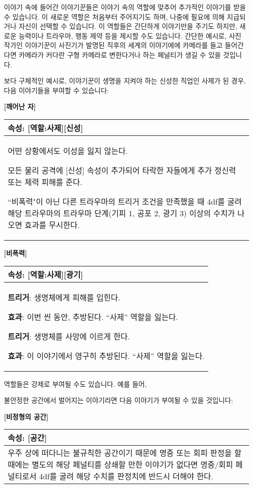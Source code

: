 \documentclass[12pt]{report}
\newenvironment{story}[2]
{\begin{center}
		{\large \textbf{[#1]}}\\[1ex]
		\begin{tabular}{|p{\textwidth}|}
			\hline
			\textbf{속성}: #2
			\\
			\hline
		}
		{ 
			\\\hline
		\end{tabular}
	\end{center}
}
\begin{document}
	이야기 속에 들어간 이야기꾼들은 이야기 속의 역할에 맞추어 추가적인 이야기를 받을 수 있습니다. 이 새로운 역할은 처음부터 주어지기도 하며, 나중에 필요에 의해 지급되거나 자신이 선택할 수 있습니다. 이 역할들은 간단하게 이야기만을 주기도 하지만, 새로운 능력이나 트라우마, 행동 제약 등을 제시할 수도 있습니다. 간단한 예시로, 사진 작가인 이야기꾼이 사진기가 발명된 직후의 세계의 이야기에에 카메라를 들고 들어간다면 카메라가 커다란 구형 카메라로 변한다거나 하는 페널티가 생길 수 있을 것입니다.

	\bigskip

	보다 구체적인 예시로, 이야기꾼이 생명을 지켜야 하는 신성한 직업인 사제가 된 경우, 다음 이야기들을 부여할 수 있습니다:
	
	\begin{story}{깨어난 자}{[역할:사제][신성]}
		어떤 상황에서도 이성을 잃지 않는다.
		
		모든 물리 공격에 [신성] 속성이 추가되어 타락한 자들에게 추가 정신력 또는 체력 피해를 준다.
		
		“비폭력"이 아닌 다른 트라우마의 트리거 조건을 만족했을 때 4df를 굴려 해당 트라우마의 트라우마 단계(기피 1, 공포 2, 광기 3) 이상의 수치가 나오면 효과를 무시한다.
	\end{story}
	
	\begin{story}{비폭력}{[역할:사제][광기]}
		\textbf{트리거}: 생명체에게 피해를 입힌다.
		
		\textbf{효과}: 이번 씬 동안, 추방된다. “사제” 역할을 잃는다.
		
		\textbf{트리거}: 생명체를 사망에 이르게 한다.
		
		\textbf{효과}: 이 이야기에서 영구히 추방된다. “사제” 역할을 잃는다.
	\end{story}
	
	역할들은 강제로 부여될 수도 있습니다. 예를 들어,
\iffalse
	러브크래프트 세계관에 들어간 이야기꾼들은 다음과 같은 역할이 부여될 수 있습니다:
	\begin{story}{점점 미쳐가는 이야기}{[세계][설화][광기]}
		이성치 100을 얻는다. 일반적으로 이해할 수 없는 일(살인, 시체, 고대의 존재등)을 목격할때마다, 그 수준에 따라 난이도와 피해량(성공/실패, 다이스 사용 가능)을 시스템이 지정한다. 그러면 1d(현재 정신력)을 굴려, 해당 수치가 난이도 이상이라면 이성치에 성공 피해량을, 미만이라면 실패 피해량을 받는다. (e.g. 60[1d4/2d8]의 경우 주사위의 결과가 60 이상이 나오면 성공하며, 성공시 1d4 정신력, 실패시 2d8 정신력을 잃는다.)
		
		현재 이성치의 10\% 이상에 달하는 피해를 한번에 받은 이야기꾼은 해당 상황에 대한 이 시나리오에서의 [기피]를, 20\% 이상인 경우 이 시나리오에서의 [공포]를 얻는다. 25\% 이상인 경우, [공포]를 얻는 것은 같으나 이는 시나리오에서 벗어나도 유지된다. 이를 방지하기 위해 이성치에 받는 피해의 전부 또는 일부를 1대1의 비율로 정신력에 받을 수 있다.
	\end{story}
	또한, 
\fi
	불안정한 공간에서 벌어지는 이야기라면 다음 이야기가 부여될 수 있을 것입니다:
	\begin{story}{비정형의 공간}{[공간]}
		우주 상에 떠다니는 불규칙한 공간이기 때문에 명중 또는 회피 판정을 할 때에는 별도의 해당 페널티를 상쇄할 만한 이야기가 없다면 명중/회피 페널티로서 4df를 굴려 해당 수치를 판정치에 반드시 더해야 한다.
	\end{story}
	
\end{document}
